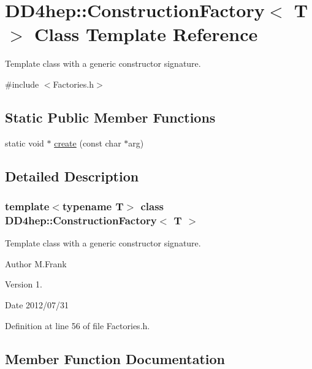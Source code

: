 \hypertarget{class_d_d4hep_1_1_construction_factory}{}\section{D\+D4hep\+:\+:Construction\+Factory$<$ T $>$ Class Template Reference}
\label{class_d_d4hep_1_1_construction_factory}


Template class with a generic constructor signature.  




{\ttfamily \#include $<$Factories.\+h$>$}

\subsection*{Static Public Member Functions}
\begin{DoxyCompactItemize}
\item 
static void $\ast$ \hyperlink{class_d_d4hep_1_1_construction_factory_adfdfbf52f13ce3d263b10623a3ce32ae}{create} (const char $\ast$arg)
\end{DoxyCompactItemize}


\subsection{Detailed Description}
\subsubsection*{template$<$typename T$>$\newline
class D\+D4hep\+::\+Construction\+Factory$<$ T $>$}

Template class with a generic constructor signature. 

\begin{DoxyAuthor}{Author}
M.\+Frank 
\end{DoxyAuthor}
\begin{DoxyVersion}{Version}
1. 
\end{DoxyVersion}
\begin{DoxyDate}{Date}
2012/07/31 
\end{DoxyDate}


Definition at line 56 of file Factories.\+h.



\subsection{Member Function Documentation}
\hypertarget{class_d_d4hep_1_1_construction_factory_adfdfbf52f13ce3d263b10623a3ce32ae}{}\label{class_d_d4hep_1_1_construction_factory_adfdfbf52f13ce3d263b10623a3ce32ae} 
